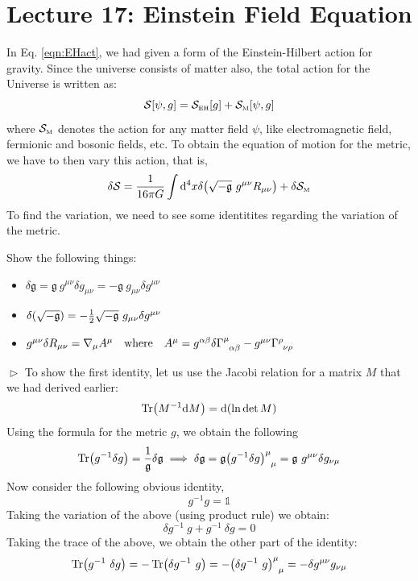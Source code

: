 \section*{Lecture 17: Einstein Field Equation}
In Eq. \ref{eqn:EHact}, we had given a form of the Einstein-Hilbert action for gravity. Since the universe consists of matter also, the total action for the Universe is written as:
$$\mathcal S[\psi, g] = \mathcal S_{\text{\tiny EH}}[g] + \mathcal S_{\text{\tiny M}}[\psi,g]$$
where $\mathcal S_{\text{\tiny M}}$ denotes the action for any matter field $\psi$, like electromagnetic field, fermionic and bosonic fields, etc.
To obtain the equation of motion for the metric, we have to then vary this action, that is, 
$$\delta \mathcal S =\frac{1}{16\pi G}\int \dd^4 x \delta \qty(\sqrt{-\mathfrak{g}}\ g^{\mu\nu}R_{\mu\nu}) +\delta \mathcal S_{\text{\tiny M}}$$
To find the variation, we need to see some identitites regarding the variation of the metric. 
\begin{tcolorbox}[colframe=black, colback=lime!20!white, boxrule=1.5pt, arc=4pt]
Show the following things:
\begin{itemize} 
    \item $\delta\mathfrak{g} = \mathfrak{g}\ g^{\mu\nu}\delta g_{\mu\nu} = -\mathfrak{g} \ g_{\mu\nu}\delta g^{\mu\nu} $
    \item $\delta(\detm) = -\frac{1}{2}\detm \ g_{\mu\nu}\delta g^{\mu\nu}$
    \item $g^{\mu\nu}\delta R_{\mu\nu} = \nabla_\mu A^\mu \quad \text{where}\quad A^\mu = g^{\alpha\beta}\delta\chris{\mu}{\alpha}{\beta} - g^{\mu\nu}\chris{\rho}{\nu}{\rho} $
\end{itemize}
\end{tcolorbox}
\noindent
$\vartriangleright$ To show the first identity, let us use the Jacobi relation for a matrix $M$ that we had derived earlier:
$$\Tr ( M^{-1}\dd M) = \dd (\ln \det M)$$
Using the formula for the metric $g$, we obtain the following
$$\Tr(g^{-1}\delta g) = \frac{1}{\mathfrak{g}}\delta \mathfrak{g} \implies \delta \mathfrak{g} ={\mathfrak{g}}\tensor{{ \qty(g^{-1}\delta g)}}{^\mu _\mu} = {\mathfrak{g}} \ g^{\mu\nu}\delta g_{\nu\mu}$$
Now consider the following obvious identity, 
$$g^{-1} g = \mathds{1}$$
Taking the variation of the above (using product rule) we obtain:
$$\delta g^{-1} \ g + g^{-1} \ \delta g = 0$$
Taking the trace of the above, we obtain the other part of the identity:
\begin{align*}
    \Tr(g^{-1} \ \delta g)= -\Tr (\delta g^{-1} \ g) =  - \tensor{{ \qty(\delta g^{-1}\ g)}}{^\mu _\mu} = -\delta g^{\mu\nu}g_{\nu\mu}
\end{align*}
